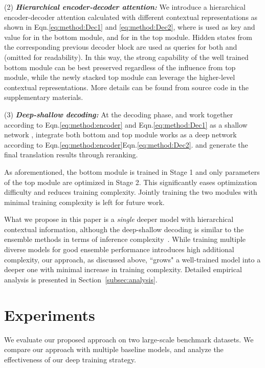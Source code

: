 \documentclass[11pt,a4paper]{article}
\begin{document}
\noindent(2) {\bf{\em Hierarchical encoder-decoder attention:}} We introduce a hierarchical encoder-decoder attention calculated with different contextual representations as shown in Eqn.\eqref{eq:method:Dec1} and \eqref{eq:method:Dec2}, where  is used as key and value for  in the bottom module, and  for  in the top module. Hidden states from the corresponding previous decoder block are used as queries for both  and  (omitted for readability). In this way, the strong capability of the well trained bottom module can be best preserved regardless of the influence from top module, while the newly stacked top module can leverage the higher-level contextual representations. More details can be found from source code in the supplementary materials.

\noindent(3) {\bf{\em Deep-shallow decoding:}} At the decoding phase,  and  work together according to Eqn.\eqref{eq:method:encoder} and Eqn.\eqref{eq:method:Dec1} as a shallow network , integrate both bottom and top module works as a deep network  according to Eqn.\eqref{eq:method:encoder}Eqn.\eqref{eq:method:Dec2}.  and  generate the final translation results through reranking.




 As aforementioned, the bottom module is trained in Stage 1 and only parameters of the top module are optimized in Stage 2. This significantly eases optimization difficulty and reduces training complexity. Jointly training the two modules with minimal training complexity is left for future work.


 What we propose in this paper is a {\em single} deeper model with hierarchical contextual information, although the deep-shallow decoding is similar to the ensemble methods in terms of inference complexity~\citep{zhou2012ensemble}. While training multiple diverse models for good ensemble performance introduces high additional complexity, our approach, as discussed above, ``grows" a well-trained model into a deeper one with minimal increase in training complexity. Detailed empirical analysis is presented in Section~\ref{subsec:analysis}.

\section{Experiments}
We evaluate our proposed approach on two large-scale benchmark datasets. We compare our approach with multiple baseline models, and analyze the effectiveness of our deep training strategy.
\end{document}
